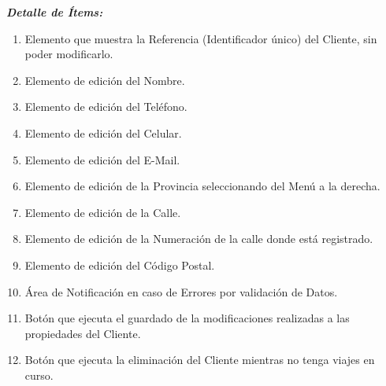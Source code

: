 \documentclass[
10pt, %
a4paper, %
oneside, %
headinclude,footinclude, %
BCOR5mm, %
]{scrartcl}
\begin{document}
\pagebreak

 \textbf{ \emph{Detalle de \'Items:} }
 \begin{enumerate}
   \item  Elemento que muestra la Referencia (Identificador \'unico) del
     Cliente, sin poder modificarlo.
   \item  Elemento de edici\'on del Nombre.
   \item  Elemento de edici\'on del Tel\'efono.
   \item  Elemento de edici\'on del Celular.
   \item  Elemento de edici\'on del E-Mail.
   \item  Elemento de edici\'on de la Provincia seleccionando
      del Men\'u a la derecha.
   \item  Elemento de edici\'on de la Calle.
   \item  Elemento de edici\'on de la Numeraci\'on de la calle donde est\'a
     registrado.
   \item  Elemento de edici\'on del C\'odigo Postal.
   \item  \'Area de Notificaci\'on en caso de Errores por validaci\'on de Datos.
   \item  Bot\'on que ejecuta el guardado de la modificaciones realizadas a las
     propiedades del Cliente.
   \item  Bot\'on que ejecuta la eliminaci\'on del Cliente mientras
    no tenga viajes en curso.
  \end{enumerate}
\end{document}
